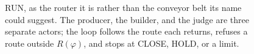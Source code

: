 \begin{figure}[t]
  \centering
  
  \caption{RUN, as the router it is rather than the conveyor belt its name could
  suggest. The producer, the builder, and the judge are three separate actors;
  the loop follows the route each returns, refuses a route outside $R(\varphi)$,
  and stops at CLOSE, HOLD, or a limit.}
  \label{fig:qpw1-run-loop}
\end{figure}
